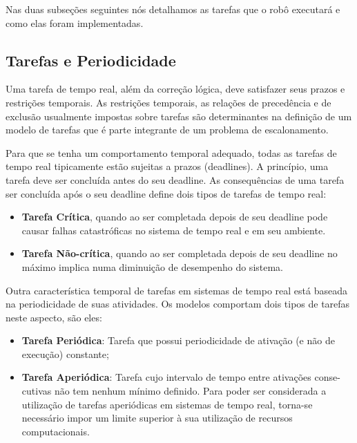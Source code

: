Nas duas subseções seguintes nós detalhamos as tarefas que o robô executará e como elas foram implementadas.

\subsection{Tarefas e Periodicidade}

Uma tarefa de tempo real, além da correção lógica, deve satisfazer seus prazos e restrições temporais. As restrições temporais, as relações de precedência e de exclusão usualmente impostas sobre tarefas são determinantes na definição de um modelo de tarefas que é parte integrante de um problema de escalonamento. 

Para que se tenha um comportamento temporal adequado, todas as tarefas de tempo real tipicamente estão sujeitas a prazos (deadlines). A princípio, uma tarefa deve ser concluída antes do seu deadline. As consequências de uma tarefa ser concluída após o seu deadline define dois tipos de tarefas de tempo real:

\begin{itemize}
	
	\item  \textbf{Tarefa Crítica}, quando ao ser completada depois de seu deadline pode causar falhas catastróficas no sistema de tempo real e em seu ambiente.
	
	\item \textbf{Tarefa Não-crítica}, quando ao ser completada depois de seu deadline no máximo implica numa diminuição de desempenho do sistema. 
	
\end{itemize}

Outra característica temporal de tarefas em sistemas de tempo real está baseada na periodicidade de suas atividades. Os modelos comportam dois tipos de tarefas neste aspecto, são eles:

\begin{itemize}
	
	\item \textbf{Tarefa Periódica}:  Tarefa que possui periodicidade de ativação (e não de execução) constante;
	
	\item \textbf{Tarefa Aperiódica}: Tarefa cujo intervalo de tempo entre ativações conse- cutivas não tem nenhum mínimo definido. Para poder ser considerada a utilização de tarefas aperiódicas em sistemas de tempo real, torna-se necessário impor um limite superior à sua utilização de recursos computacionais.
	
\end{itemize}

